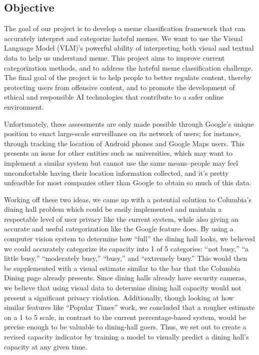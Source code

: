 \documentclass{article}
\begin{document}
\begin{multicols}{2}
\subsection*{Objective}
The goal of our project is to develop a meme classification framework that can accurately interpret and categorize hateful memes. We want to use the Visual Language Model (VLM)'s powerful ability of interpreting both visual and textual data to help us understand meme. This project aims to improve current categorization methods, and to address the hateful meme classification challenge. The final goal of the project is to help people to better regulate content, thereby protecting users from offensive content, and to promote the development of ethical and responsible AI technologies that contribute to a safer online environment.

Unfortunately, these assessments are only made possible through Google’s unique position to enact large-scale surveillance on its network of users; for instance, through tracking the location of Android phones and Google Maps users. This presents an issue for other entities such as universities, which may want to implement a similar system but cannot use the same means–people may feel uncomfortable having their location information collected, and it’s pretty unfeasible for most companies other than Google to obtain so much of this data.

Working off these two ideas, we came up with a potential solution to Columbia’s dining hall problem which could be easily implemented and maintain a respectable level of user privacy like the current system, while also giving an accurate and useful categorization like the Google feature does. By using a computer vision system to determine how “full” the dining hall looks, we believed we could accurately categorize its capacity into 1 of 5 categories: “not busy,” “a little busy,” “moderately busy,” “busy,” and “extremely busy.” This would then be supplemented with a visual estimate similar to the bar that the Columbia Dining page already presents. Since dining halls already have security cameras, we believe that using visual data to determine dining hall capacity would not present a significant privacy violation. Additionally, though looking at how similar features like “Popular Times” work, we concluded that a rougher estimate on a 1 to 5 scale, in contrast to the current percentage-based system, would be precise enough to be valuable to dining-hall goers. Thus, we set out to create a revised capacity indicator by training a model to visually predict a dining hall’s capacity at any given time.



\end{multicols}
\end{document}
